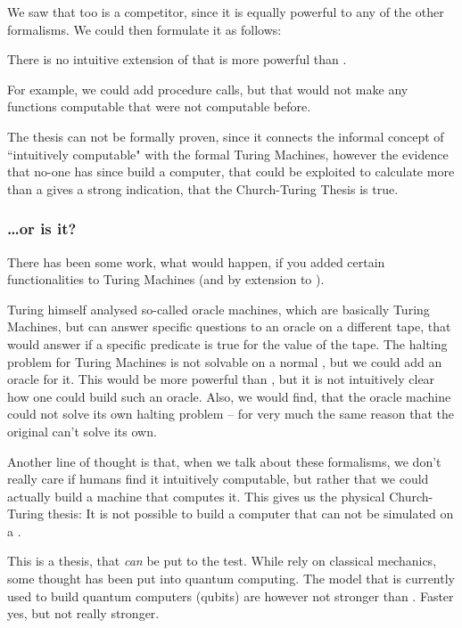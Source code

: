 We saw that \WHILE too is a competitor, since it is equally powerful to any 
of the other formalisms. We could then formulate it as follows:

\begin{thesis}
	There is no intuitive extension of \WHILE that is more powerful than \WHILE.
\end{thesis}

For example, we could add procedure calls, but that would not make any 
functions computable that were not computable before.

The thesis can not be formally proven, since it connects the informal concept 
of ``intuitively computable" with the formal Turing Machines, however the 
evidence that no-one has since build a computer, that could be exploited to
calculate more than a \TM gives a strong indication, that the Church-Turing
Thesis is true.

\subsubsection{\dots or is it?}
There has been some work, what would happen, if you added certain 
functionalities to Turing Machines (and by extension to \WHILE). 

Turing himself analysed so-called oracle machines, which are basically Turing 
Machines, but can answer specific questions to an oracle on a different tape, 
that would answer if a specific predicate is true for the value of the tape.
The halting problem for Turing Machines is not solvable on a normal \TM, but 
we could add an oracle for it. This would be more powerful than \TM, but it 
is not intuitively clear how one could build such an oracle. Also, we would 
find, that the oracle machine could not solve its own halting problem -- for 
very much the same reason that the original \TM can't solve its own.

Another line of thought is that, when we talk about these formalisms, we 
don't really care if humans find it intuitively computable, but rather that 
we could actually build a machine that computes it. This gives us the 
physical Church-Turing thesis: It is not possible to build a computer that 
can not be simulated on a \TM.

This is a thesis, that {\em can} be put to the test. While \TM rely on 
classical mechanics, some thought has been put into quantum computing. The 
model that is currently used to build quantum computers (qubits) are however
not stronger than \TM. Faster yes, but not really stronger.

